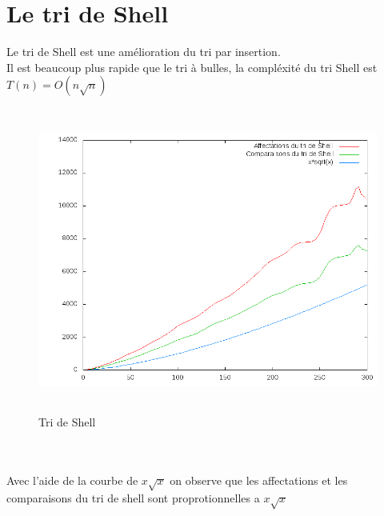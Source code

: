 \documentclass[12pt,a4paper,openany]{article}
\begin{document}
	\section{Le tri de Shell}
		Le tri de Shell est une amélioration du tri par insertion. \\
		Il est beaucoup plus rapide que le tri à bulles, la compléxité du tri Shell est $T(n) = O(n\sqrt{n})$
		\begin{figure}[!h] 
			\begin{center}	
				\includegraphics[height=10cm]{triShell.png}										
				\caption{Tri de Shell}
			\end{center}
		\end{figure}
		\\ \\
			Avec l'aide de la courbe de $x\sqrt{x}$ on observe que les affectations et les comparaisons du tri de shell sont proprotionnelles a $x\sqrt{x}$
		\newpage
\end{document}
